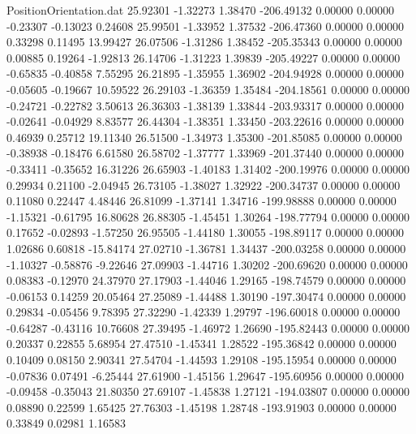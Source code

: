 \begin{filecontents}{PositionOrientation.dat}
  25.92301   -1.32273    1.38470  -206.49132    0.00000    0.00000   -0.23307   -0.13023    0.24608
  25.99501   -1.33952    1.37532  -206.47360    0.00000    0.00000    0.33298    0.11495   13.99427
  26.07506   -1.31286    1.38452  -205.35343    0.00000    0.00000    0.00885    0.19264   -1.92813
  26.14706   -1.31223    1.39839  -205.49227    0.00000    0.00000   -0.65835   -0.40858    7.55295
  26.21895   -1.35955    1.36902  -204.94928    0.00000    0.00000   -0.05605   -0.19667   10.59522
  26.29103   -1.36359    1.35484  -204.18561    0.00000    0.00000   -0.24721   -0.22782    3.50613
  26.36303   -1.38139    1.33844  -203.93317    0.00000    0.00000   -0.02641   -0.04929    8.83577
  26.44304   -1.38351    1.33450  -203.22616    0.00000    0.00000    0.46939    0.25712   19.11340
  26.51500   -1.34973    1.35300  -201.85085    0.00000    0.00000   -0.38938   -0.18476    6.61580
  26.58702   -1.37777    1.33969  -201.37440    0.00000    0.00000   -0.33411   -0.35652   16.31226
  26.65903   -1.40183    1.31402  -200.19976    0.00000    0.00000    0.29934    0.21100   -2.04945
  26.73105   -1.38027    1.32922  -200.34737    0.00000    0.00000    0.11080    0.22447    4.48446
  26.81099   -1.37141    1.34716  -199.98888    0.00000    0.00000   -1.15321   -0.61795   16.80628
  26.88305   -1.45451    1.30264  -198.77794    0.00000    0.00000    0.17652   -0.02893   -1.57250
  26.95505   -1.44180    1.30055  -198.89117    0.00000    0.00000    1.02686    0.60818  -15.84174
  27.02710   -1.36781    1.34437  -200.03258    0.00000    0.00000   -1.10327   -0.58876   -9.22646
  27.09903   -1.44716    1.30202  -200.69620    0.00000    0.00000    0.08383   -0.12970   24.37970
  27.17903   -1.44046    1.29165  -198.74579    0.00000    0.00000   -0.06153    0.14259   20.05464
  27.25089   -1.44488    1.30190  -197.30474    0.00000    0.00000    0.29834   -0.05456    9.78395
  27.32290   -1.42339    1.29797  -196.60018    0.00000    0.00000   -0.64287   -0.43116   10.76608
  27.39495   -1.46972    1.26690  -195.82443    0.00000    0.00000    0.20337    0.22855    5.68954
  27.47510   -1.45341    1.28522  -195.36842    0.00000    0.00000    0.10409    0.08150    2.90341
  27.54704   -1.44593    1.29108  -195.15954    0.00000    0.00000   -0.07836    0.07491   -6.25444
  27.61900   -1.45156    1.29647  -195.60956    0.00000    0.00000   -0.09458   -0.35043   21.80350
  27.69107   -1.45838    1.27121  -194.03807    0.00000    0.00000    0.08890    0.22599    1.65425
  27.76303   -1.45198    1.28748  -193.91903    0.00000    0.00000    0.33849    0.02981    1.16583

\end{filecontents}
